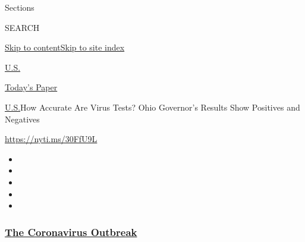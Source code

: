 Sections

SEARCH

\protect\hyperlink{site-content}{Skip to
content}\protect\hyperlink{site-index}{Skip to site index}

\href{https://www.nytimes3xbfgragh.onion/section/us}{U.S.}

\href{https://myaccount.nytimes3xbfgragh.onion/auth/login?response_type=cookie\&client_id=vi}{}

\href{https://www.nytimes3xbfgragh.onion/section/todayspaper}{Today's
Paper}

\href{/section/us}{U.S.}\textbar{}How Accurate Are Virus Tests? Ohio
Governor's Results Show Positives and Negatives

\url{https://nyti.ms/30FfU9L}

\begin{itemize}
\item
\item
\item
\item
\item
\end{itemize}

\hypertarget{the-coronavirus-outbreak}{%
\subsubsection{\texorpdfstring{\href{https://www.nytimes3xbfgragh.onion/news-event/coronavirus?name=styln-coronavirus-national\&region=TOP_BANNER\&block=storyline_menu_recirc\&action=click\&pgtype=Article\&impression_id=55a8bd70-f2d1-11ea-8405-8513584d3c2d\&variant=undefined}{The
Coronavirus
Outbreak}}{The Coronavirus Outbreak}}\label{the-coronavirus-outbreak}}

